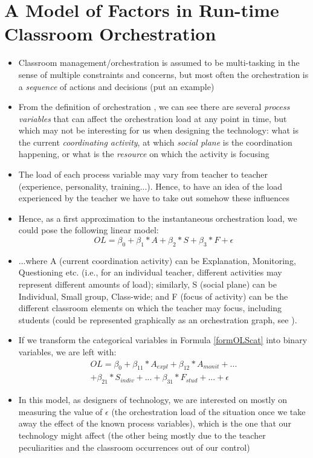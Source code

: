 \documentclass[10pt,journal,compsoc]{IEEEtran}
\begin{document}
\section{A Model of Factors in Run-time Classroom Orchestration}
\label{sec:model}
\begin{itemize}
\item Classroom management/orchestration is assumed to be multi-tasking \cite{Doyle2006} in the sense of multiple constraints and concerns, but most often the orchestration is a \textit{sequence} of actions and decisions (put an example)
\item From the definition of orchestration \cite{Dillenbourg2009}, we can see there are several \textit{process variables} that can affect the orchestration load at any point in time, but which may not be interesting for us when designing the technology: what is the current \textit{coordinating activity}, at which \textit{social plane} is the coordination happening, or what is the \textit{resource} on which the activity is focusing
\item The load of each process variable may vary from teacher to teacher (experience, personality, training...). Hence, to have an idea of the load experienced by the teacher we have to take out somehow these influences
\item Hence, as a first approximation to the instantaneous orchestration load, we could pose the following linear model:
\begin{equation}
OL = \beta_0 + \beta_1*A + \beta_2*S + \beta_3*F + \epsilon
\label{formOLScat}
\end{equation}
\item ...where A (current coordination activity) can be Explanation, Monitoring, Questioning etc. (i.e., for an individual teacher, different activities may represent different amounts of load); similarly, S (social plane) can be Individual, Small group, Class-wide; and F (focus of activity) can be the different classroom elements on which the teacher may focus, including students (could be represented graphically as an orchestration graph, see \cite{prieto2011recurrent}). 
\item If we transform the categorical variables in Formula \ref{formOLScat} into binary variables, we are left with:
\begin{multline}
\label{formOLS}
OL = \beta_0 + \beta_{11}*A_{expl} + \beta_{12}*A_{monit} + ... \\ + \beta_{21}*S_{indiv} + ... + \beta_{31}*F_{stud} + ... + \epsilon
\end{multline}
\item In this model, as designers of technology, we are interested on mostly on measuring the value of $\epsilon$ (the orchestration load of the situation once we take away the effect of the known process variables), which is the one that our technology might affect (the other being mostly due to the teacher peculiarities and the classroom occurrences out of our control)
\end{itemize}
\end{document}
